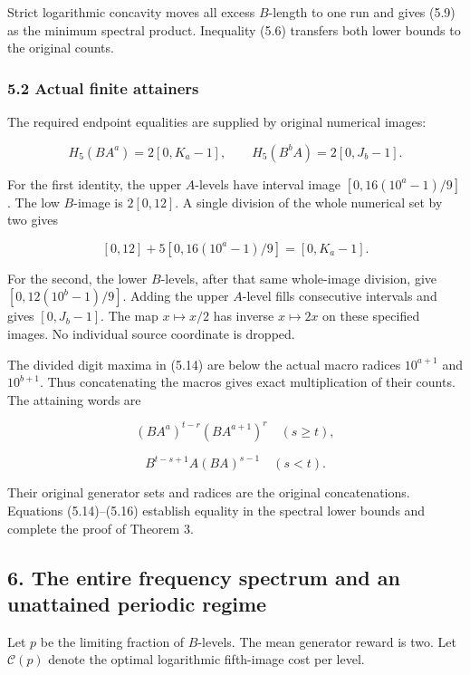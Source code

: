 Strict logarithmic concavity moves all excess \(B\)-length to one run and gives (5.9) as the minimum spectral product. Inequality (5.6) transfers both lower bounds to the original counts.

\subsubsection{5.2 Actual finite attainers}\label{actual-finite-attainers}

The required endpoint equalities are supplied by original numerical images:

\[
H_5(BA^a)=2[0,K_a-1],\qquad
H_5(B^bA)=2[0,J_b-1].
\tag{5.14}
\]

For the first identity, the upper \(A\)-levels have interval image \([0,16(10^a-1)/9]\). The low \(B\)-image is \(2[0,12]\). A single division of the whole numerical set by two gives

\[
[0,12]+5[0,16(10^a-1)/9]
=[0,K_a-1].
\]

For the second, the lower \(B\)-levels, after that same whole-image division, give \([0,12(10^b-1)/9]\). Adding the upper \(A\)-level fills consecutive intervals and gives \([0,J_b-1]\). The map \(x\mapsto x/2\) has inverse \(x\mapsto2x\) on these specified images. No individual source coordinate is dropped.

The divided digit maxima in (5.14) are below the actual macro radices \(10^{a+1}\) and \(10^{b+1}\). Thus concatenating the macros gives exact multiplication of their counts. The attaining words are

\[
(BA^a)^{t-r}(BA^{a+1})^r\quad(s\ge t),
\tag{5.15}
\]

\[
B^{t-s+1}A(BA)^{s-1}\quad(s<t).
\tag{5.16}
\]

Their original generator sets and radices are the original concatenations. Equations (5.14)--(5.16) establish equality in the spectral lower bounds and complete the proof of Theorem 3.

\subsection{6. The entire frequency spectrum and an unattained periodic regime}\label{the-entire-frequency-spectrum-and-an-unattained-periodic-regime}

Let \(p\) be the limiting fraction of \(B\)-levels. The mean generator reward is two. Let \(\mathcal C(p)\) denote the optimal logarithmic fifth-image cost per level.

